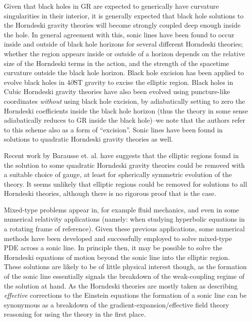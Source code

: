 \documentclass{ws-ijmpd}
\begin{document}
Given that black holes in GR are expected to generically
have curvature singularities in their interior\cite{wald2010general},
it is generally expected that black hole solutions to the Horndeski gravity
theories will become strongly coupled deep enough inside the hole. 
In general agreement with this,
sonic lines have been found to occur inside and outside
of black hole horizons for several different
Horndeski theories;
whether the region appears inside or outside of a horizon depends
on the relative size of the Horndeski terms in the action,
and the strength of the spacetime curvature outside the black hole
horizon\cite{Ripley:2019hxt,Bernard:2019fjb,Ripley:2019irj,
Ripley:2019aqj,Ripley:2020vpk,Figueras:2020dzx,East:2021bqk}.
Black hole excision has been applied to evolve black holes in
4$\partial$ST gravity\cite{East:2020hgw,East:2021bqk} to
excise the elliptic region.
Black holes in Cubic Horndeski gravity theories have also been
evolved using puncture-like coordinates \emph{without} using
black hole excision, 
by adiabatically setting to zero the Horndeski coefficients
inside the black hole horizon\cite{Figueras:2020dzx,Figueras:2021abd}
(thus the theory in some sense adiabatically reduces to GR
inside the black hole)--we note that the authors refer to this
scheme also as a form of ``excision''.
Sonic lines have been found in solutions to quadratic Horndeski
gravity theories as 
well\cite{Bernard:2019fjb,Lara:2021piy,Bezares:2020wkn}.

Recent work by Barausse et. al. have suggests that the elliptic
regions found in the solution to some quadratic Horndeski
gravity theories could be removed with a suitable choice
of gauge\cite{Bezares:2021dma}, at least for spherically
symmetric evolution of the theory.
It seems unlikely  
that elliptic regions could be removed for solutions
to all Horndeski theories,
although there is no rigorous proof that is the case.

Mixed-type problems appear in, for example fluid 
mechanics\cite{doi:10.1142/S0219891604000081,ferrari1968transonic}, 
and even in some numerical relativity
applications (namely: when studying hyperbolic
equations in a rotating frame of reference)\cite{Stewart_2001}.
Given these previous applications, some numerical methods have
been developed and successfully employed to solve mixed-type PDE
across a sonic line\cite{AZIZ197655,doi:10.1137/0718047,Stewart_2001}.
In principle then, it may be possible to solve the Horndeski
equations of motion beyond the sonic line into the elliptic region.
These solutions are likely to be of little physical interest though,
as the formation of the sonic line essentially signals the breakdown
of the weak-coupling regime of the solution at hand.
As the Horndeski theories are mostly taken as describing
\emph{effective} corrections to the Einstein equations
the formation of a sonic line can be synonymous as a breakdown of
the gradient-expansion/effective field theory reasoning for using
the theory in the first place.
\end{document}

